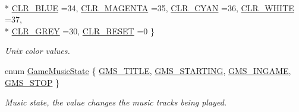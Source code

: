 \begin{DoxyCompactItemize}
\\*
\hyperlink{namespace_chase_game_a5acdf639e912d1e78814b7fae21afc7ba206cb9e67be830b771bbf44488c40d66}{C\-L\-R\-\_\-\-B\-L\-U\-E} =34, 
\hyperlink{namespace_chase_game_a5acdf639e912d1e78814b7fae21afc7ba6ce8de58df1a149d734ebcdbf711fed9}{C\-L\-R\-\_\-\-M\-A\-G\-E\-N\-T\-A} =35, 
\hyperlink{namespace_chase_game_a5acdf639e912d1e78814b7fae21afc7baa190fadb3645da6bca096b377cda2542}{C\-L\-R\-\_\-\-C\-Y\-A\-N} =36, 
\hyperlink{namespace_chase_game_a5acdf639e912d1e78814b7fae21afc7baefa8ce8fa562fcb596842176d5b1222d}{C\-L\-R\-\_\-\-W\-H\-I\-T\-E} =37, 
\\*
\hyperlink{namespace_chase_game_a5acdf639e912d1e78814b7fae21afc7ba1d11a3c17a5e12280a482d5d39c12f09}{C\-L\-R\-\_\-\-G\-R\-E\-Y} =30, 
\hyperlink{namespace_chase_game_a5acdf639e912d1e78814b7fae21afc7bab062e50df9f6e90f6c4cce85d5d420df}{C\-L\-R\-\_\-\-R\-E\-S\-E\-T} =0
 \}
\begin{DoxyCompactList}\small\item\em Unix color values. \end{DoxyCompactList}\item 
enum \hyperlink{namespace_chase_game_a85936e0bdb5509ede7ebb2543de5be42}{Game\-Music\-State} \{ \hyperlink{namespace_chase_game_a85936e0bdb5509ede7ebb2543de5be42ae2cef0894718493a1e334a948734fe65}{G\-M\-S\-\_\-\-T\-I\-T\-L\-E}, 
\hyperlink{namespace_chase_game_a85936e0bdb5509ede7ebb2543de5be42a9c9cc6c997ce9d50efd2f3d815323b11}{G\-M\-S\-\_\-\-S\-T\-A\-R\-T\-I\-N\-G}, 
\hyperlink{namespace_chase_game_a85936e0bdb5509ede7ebb2543de5be42a575913ea08f1bd0667c644624b56102f}{G\-M\-S\-\_\-\-I\-N\-G\-A\-M\-E}, 
\hyperlink{namespace_chase_game_a85936e0bdb5509ede7ebb2543de5be42aeff71e80a88a58ab6f8d049daaccc84a}{G\-M\-S\-\_\-\-S\-T\-O\-P}
 \}
\begin{DoxyCompactList}\small\item\em Music state, the value changes the music tracks being played. \end{DoxyCompactList}\end{DoxyCompactItemize}
